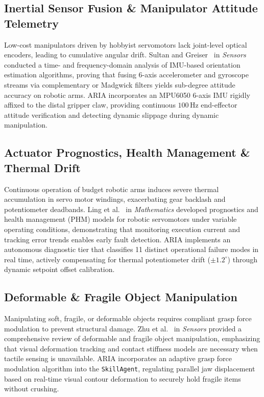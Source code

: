 \documentclass[journal]{IEEEtran}
\begin{document}
\subsection{Inertial Sensor Fusion \& Manipulator Attitude Telemetry}
Low-cost manipulators driven by hobbyist servomotors lack joint-level optical encoders, leading to cumulative angular drift. Sultan and Greiser~\cite{aria_118_team_2025_time} in \textit{Sensors} conducted a time- and frequency-domain analysis of IMU-based orientation estimation algorithms, proving that fusing 6-axis accelerometer and gyroscope streams via complementary or Madgwick filters yields sub-degree attitude accuracy on robotic arms. ARIA incorporates an MPU6050 6-axis IMU rigidly affixed to the distal gripper claw, providing continuous $100$\,Hz end-effector attitude verification and detecting dynamic slippage during dynamic manipulation.

\subsection{Actuator Prognostics, Health Management \& Thermal Drift}
Continuous operation of budget robotic arms induces severe thermal accumulation in servo motor windings, exacerbating gear backlash and potentiometer deadbands. Ling et al.~\cite{aria_086_ling_2023_prognostics} in \textit{Mathematics} developed prognostics and health management (PHM) models for robotic servomotors under variable operating conditions, demonstrating that monitoring execution current and tracking error trends enables early fault detection. ARIA implements an autonomous diagnostic tier that classifies 11 distinct operational failure modes in real time, actively compensating for thermal potentiometer drift ($\pm 1.2^\circ$) through dynamic setpoint offset calibration.

\subsection{Deformable \& Fragile Object Manipulation}
Manipulating soft, fragile, or deformable objects requires compliant grasp force modulation to prevent structural damage. Zhu et al.~\cite{aria_119_zhu_2025_deformable} in \textit{Sensors} provided a comprehensive review of deformable and fragile object manipulation, emphasizing that visual deformation tracking and contact stiffness models are necessary when tactile sensing is unavailable. ARIA incorporates an adaptive grasp force modulation algorithm into the \texttt{SkillAgent}, regulating parallel jaw displacement based on real-time visual contour deformation to securely hold fragile items without crushing.
\end{document}
